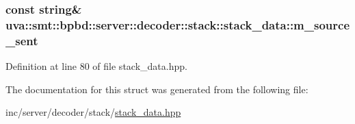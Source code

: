 \subsubsection[{m\+\_\+source\+\_\+sent}]{\setlength{\rightskip}{0pt plus 5cm}const string\& uva\+::smt\+::bpbd\+::server\+::decoder\+::stack\+::stack\+\_\+data\+::m\+\_\+source\+\_\+sent}\label{structuva_1_1smt_1_1bpbd_1_1server_1_1decoder_1_1stack_1_1stack__data_a334e2b5c19d275f48e65272e17df882c}


Definition at line 80 of file stack\+\_\+data.\+hpp.



The documentation for this struct was generated from the following file\+:\begin{DoxyCompactItemize}
\item 
inc/server/decoder/stack/\hyperlink{stack__data_8hpp}{stack\+\_\+data.\+hpp}\end{DoxyCompactItemize}
